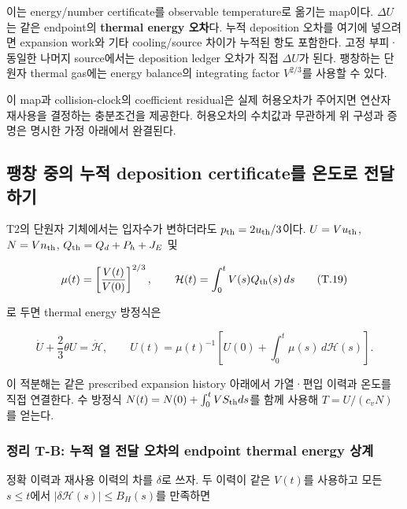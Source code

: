 \documentclass[11pt,a4paper]{article}
\begin{document}
이는 energy/number certificate를 observable temperature로 옮기는 map이다. \(\Delta U\)는 같은 endpoint의 \textbf{thermal energy 오차}다. 누적 deposition 오차를 여기에 넣으려면 expansion work와 기타 cooling/source 차이가 누적된 항도 포함한다. 고정 부피·동일한 나머지 source에서는 deposition ledger 오차가 직접 \(\Delta U\)가 된다. 팽창하는 단원자 thermal gas에는 energy balance의 integrating factor \(V^{2/3}\)를 사용할 수 있다.

이 map과 collision-clock의 coefficient residual은 실제 허용오차가 주어지면 연산자 재사용을 결정하는 충분조건을 제공한다. 허용오차의 수치값과 무관하게 위 구성과 증명은 명시한 가정 아래에서 완결된다.

\hypertarget{uxd33duxcc3d-uxc911uxc758-uxb204uxc801-deposition-certificateuxb97c-uxc628uxb3c4uxb85c-uxc804uxb2ecuxd558uxae30}{%
\subsection{팽창 중의 누적 deposition certificate를 온도로 전달하기}\label{uxd33duxcc3d-uxc911uxc758-uxb204uxc801-deposition-certificateuxb97c-uxc628uxb3c4uxb85c-uxc804uxb2ecuxd558uxae30}}

T2의 단원자 기체에서는 입자수가 변하더라도 \(p_{\rm th}=2u_{\rm th}/3\)이다. \(U=Vu_{\rm th}\), \(N=Vn_{\rm th}\), \(Q_{\rm th}=Q_d+P_h+J_E\) 및

\[
\mu(t)=\left[\frac{V(t)}{V(0)}\right]^{2/3},\qquad
\mathcal H(t)=\int_0^t V(s)Q_{\rm th}(s)\,ds
\tag{T.19}
\]

로 두면 thermal energy 방정식은

\[
\dot U+\frac23\theta U=\dot{\mathcal H},\qquad
\boxed{U(t)=\mu(t)^{-1}
\left[U(0)+\int_0^t\mu(s)\,d\mathcal H(s)\right]}.
\tag{T.20}
\]

이 적분해는 같은 prescribed expansion history 아래에서 가열·편입 이력과 온도를 직접 연결한다. 수 방정식 \(N(t)=N(0)+\int_0^t VS_{\rm th}ds\)를 함께 사용해 \(T=U/(c_vN)\)를 얻는다.

\hypertarget{uxc815uxb9ac-t-b-uxb204uxc801-uxc5f4-uxc804uxb2ec-uxc624uxcc28uxc758-endpoint-thermal-energy-uxc0c1uxacc4}{%
\subsubsection{정리 T-B: 누적 열 전달 오차의 endpoint thermal energy 상계}\label{uxc815uxb9ac-t-b-uxb204uxc801-uxc5f4-uxc804uxb2ec-uxc624uxcc28uxc758-endpoint-thermal-energy-uxc0c1uxacc4}}

정확 이력과 재사용 이력의 차를 \(\delta\)로 쓰자. 두 이력이 같은 \(V(t)\)를 사용하고 모든 \(s\le t\)에서 \(|\delta\mathcal H(s)|\le B_H(s)\)를 만족하면
\end{document}
